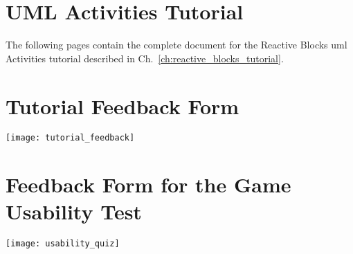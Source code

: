 \begin{appendices}

\chapter{UML Activities Tutorial}
\label{appx:tutorial}
The following pages contain the complete document for the Reactive Blocks \gls{uml} Activities tutorial described in Ch.~\ref{ch:reactive_blocks_tutorial}.


\chapter{Tutorial Feedback Form}
\label{appx:feedback_form}

\texttt{[image: tutorial\_feedback]}


\chapter{Feedback Form for the Game Usability Test}
\label{appx:game_feedback_form}

\texttt{[image: usability\_quiz]}







\end{appendices}